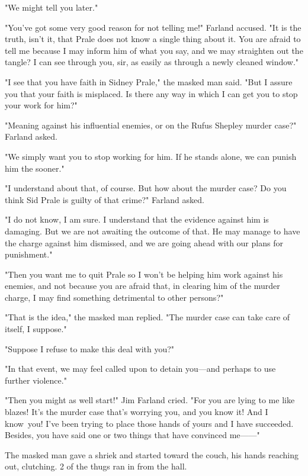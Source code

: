 \documentclass{novel}
\begin{document}
"We might tell you later."

"You've got some very good reason for not telling me!" Farland accused. "It is the truth, isn't it, that Prale does not know a single thing about it. You are afraid to tell me because I may inform him of what you say, and we may straighten out the tangle? I can see through you, sir, as easily as through a newly cleaned window."

"I see that you have faith in Sidney Prale," the masked man said. "But I assure you that your faith is misplaced. Is there any way in which I can get you to stop your work for him?"

"Meaning against his influential enemies, or on the Rufus Shepley murder case?" Farland asked.

"We simply want you to stop working for him. If he stands alone, we can punish him the sooner."

"I understand about that, of course. But how about the murder case? Do you think Sid Prale is guilty of that crime?" Farland asked.

"I do not know, I am sure. I understand that the evidence against him is damaging. But we are not awaiting the outcome of that. He may manage to have the charge against him dismissed, and we are going ahead with our plans for punishment."

"Then you want me to quit Prale so I won't be helping him work against his enemies, and not because you are afraid that, in clearing him of the murder charge, I may find something detrimental to other persons?"

"That is the idea," the masked man replied. "The murder case can take care of itself, I suppose."

"Suppose I refuse to make this deal with you?"

"In that event, we may feel called upon to detain you---and perhaps to use further violence."

"Then you might as well start!" Jim Farland cried. "For you are lying to me like blazes! It's the murder case that's worrying you, and you know it! And I know you! I've been trying to place those hands of yours and I have succeeded. Besides, you have said one or two things that have convinced me------"

The masked man gave a shriek and started toward the couch, his hands reaching out, clutching. 2 of the thugs ran in from the hall.

\vspace{2\nbs}
\clearpage
\thispagestyle{empty}
\end{document}
